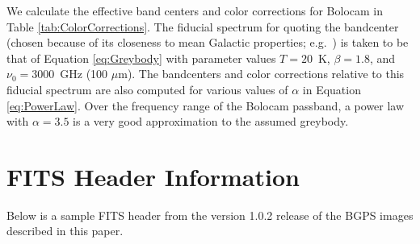 \documentclass[12pt,preprint]{aastex}
\newcommand{\eg}{{e.g.\/}}
\newcommand{\mum}{\ensuremath{\mu \mathrm{m}}}
\begin{document}
\begin{appendix}
We calculate the effective band centers and color corrections for
Bolocam in Table \ref{tab:ColorCorrections}.  The fiducial spectrum
for quoting the bandcenter (chosen because of its closeness to mean
Galactic properties; \eg\ \citet{reach95}) is taken to be that of
Equation \ref{eq:Greybody} with parameter values $T=20$~K,
$\beta=1.8$, and $\nu_0=3000$~GHz (100 \mum).  The bandcenters and
color corrections relative to this fiducial spectrum are also computed
for various values of $\alpha$ in Equation \ref{eq:PowerLaw}.  Over
the frequency range of the Bolocam passband, a power law with
$\alpha=3.5$ is a very good approximation to the assumed greybody.

\section{FITS Header Information}
\label{app:FITS_Header}

Below is a sample FITS header from the version 1.0.2 release of the
BGPS images described in this paper.

\begin{verbatim}


\end{verbatim}
\end{appendix}
\end{document}
